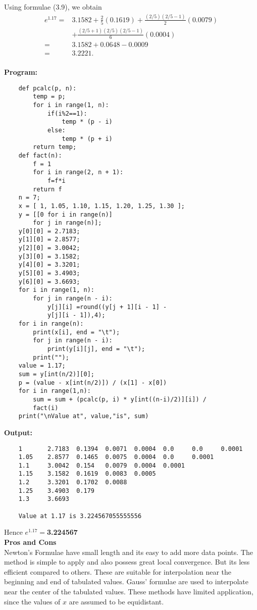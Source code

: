 \documentclass[12pt,a4paper,oneside]{book}
\begin{document}
Using formulae (3.9), we obtain
$$
\begin{aligned}
	e^{1.17}= & 3.1582+\frac{2}{5}(0.1619)+\frac{(2 / 5)(2 / 5-1)}{2}(0.0079) \\
	& +\frac{(2 / 5+1)(2 / 5)(2 / 5-1)}{6}(0.0004) \\
	= & 3.1582+0.0648-0.0009 \\
	= & 3.2221 .
\end{aligned}
$$\\
\textbf{Program:}
\begin{lstlisting}
	def pcalc(p, n):
		temp = p;
		for i in range(1, n):
			if(i%2==1):
				temp * (p - i)
			else:
				temp * (p + i)
		return temp;
	def fact(n):
		f = 1
		for i in range(2, n + 1):
			f=f*i
		return f
	n = 7;
	x = [ 1, 1.05, 1.10, 1.15, 1.20, 1.25, 1.30 ];
	y = [[0 for i in range(n)]
		for j in range(n)];
	y[0][0] = 2.7183;
	y[1][0] = 2.8577;
	y[2][0] = 3.0042;
	y[3][0] = 3.1582; 
	y[4][0] = 3.3201;
	y[5][0] = 3.4903;
	y[6][0] = 3.6693;
	for i in range(1, n):
		for j in range(n - i):
			y[j][i] =round((y[j + 1][i - 1] - 
			y[j][i - 1]),4);
	for i in range(n):
		print(x[i], end = "\t");
		for j in range(n - i):
			print(y[i][j], end = "\t");
		print("");
	value = 1.17;
	sum = y[int(n/2)][0];
	p = (value - x[int(n/2)]) / (x[1] - x[0])
	for i in range(1,n):
		sum = sum + (pcalc(p, i) * y[int((n-i)/2)][i]) / 
		fact(i)
	print("\nValue at", value,"is", sum)
\end{lstlisting}
\textbf{Output:}
\begin{verbatim}
	1       2.7183  0.1394  0.0071  0.0004  0.0     0.0     0.0001
	1.05    2.8577  0.1465  0.0075  0.0004  0.0     0.0001
	1.1     3.0042  0.154   0.0079  0.0004  0.0001
	1.15    3.1582  0.1619  0.0083  0.0005
	1.2     3.3201  0.1702  0.0088
	1.25    3.4903  0.179
	1.3     3.6693
	
	Value at 1.17 is 3.224567055555556
\end{verbatim}
Hence $e^{1.17}=$\textbf{3.224567}\\

\noindent
\textbf{\large Pros and Cons}\\
Newton's Formulae have small length and its easy to add more data points. The method is simple to apply and also possess great local convergence.  But its less efficient compared to others. These are suitable for interpolation near the beginning and end of tabulated values. Gauss' formulae are used to interpolate near the center of the tabulated values. These methods have limited application, since the values of $x$ are assumed to be equidistant.
\end{document}
